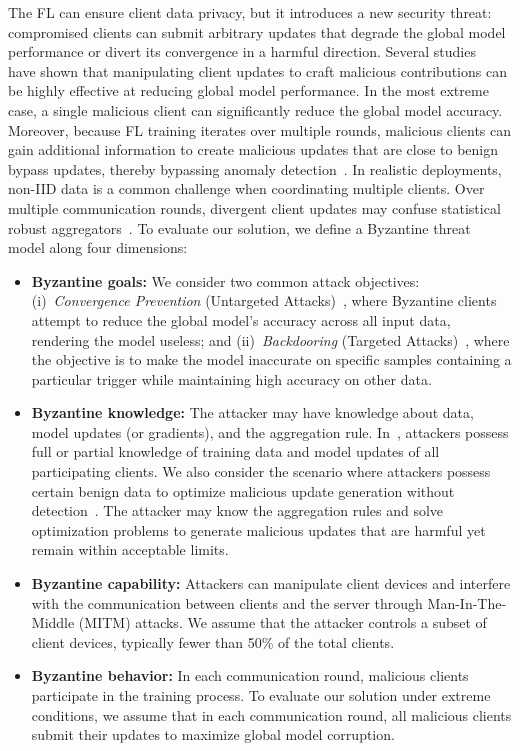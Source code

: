 \documentclass[journal]{IEEEtran}
\begin{document}
The FL can ensure client data privacy, but it introduces a new security threat: compromised clients can submit arbitrary updates that degrade the global model performance or divert its convergence in a harmful direction. Several studies~\cite{yin2018byzantine, shi2022challenges} have shown that manipulating client updates to craft malicious contributions can be highly effective at reducing global model performance. In the most extreme case, a single malicious client can significantly reduce the global model accuracy. Moreover, because FL training iterates over multiple rounds, malicious clients can gain additional information to create malicious updates that are close to benign bypass updates, thereby bypassing anomaly detection~\cite{baruch2019little}. In realistic deployments, non-IID data is a common challenge when coordinating multiple clients. Over multiple communication rounds, divergent client updates may confuse statistical robust aggregators~\cite{blanchard2017machine, yin2018byzantine}. To evaluate our solution, we define a Byzantine threat model along four dimensions:

\begin{itemize}
    \item \textbf{Byzantine goals:} We consider two common attack objectives: (i)~\textit{Convergence Prevention} (Untargeted Attacks)~\cite{baruch2019little}, where Byzantine clients attempt to reduce the global model's accuracy across all input data, rendering the model useless; and (ii)~\textit{Backdooring} (Targeted Attacks)~\cite{shejwalkar2021manipulating}, where the objective is to make the model inaccurate on specific samples containing a particular trigger while maintaining high accuracy on other data.

    \item \textbf{Byzantine knowledge:} The attacker may have knowledge about data, model updates (or gradients), and the aggregation rule. In~\cite{baruch2019little, fang2020local}, attackers possess full or partial knowledge of training data and model updates of all participating clients. We also consider the scenario where attackers possess certain benign data to optimize malicious update generation without detection~\cite{shejwalkar2021manipulating}. The attacker may know the aggregation rules and solve optimization problems to generate malicious updates that are harmful yet remain within acceptable limits.

    \item \textbf{Byzantine capability:} Attackers can manipulate client devices and interfere with the communication between clients and the server through Man-In-The-Middle (MITM) attacks. We assume that the attacker controls a subset of client devices, typically fewer than 50\% of the total clients.

    \item \textbf{Byzantine behavior:} In each communication round, malicious clients participate in the training process. To evaluate our solution under extreme conditions, we assume that in each communication round, all malicious clients submit their updates to maximize global model corruption.
\end{itemize}
\end{document}
